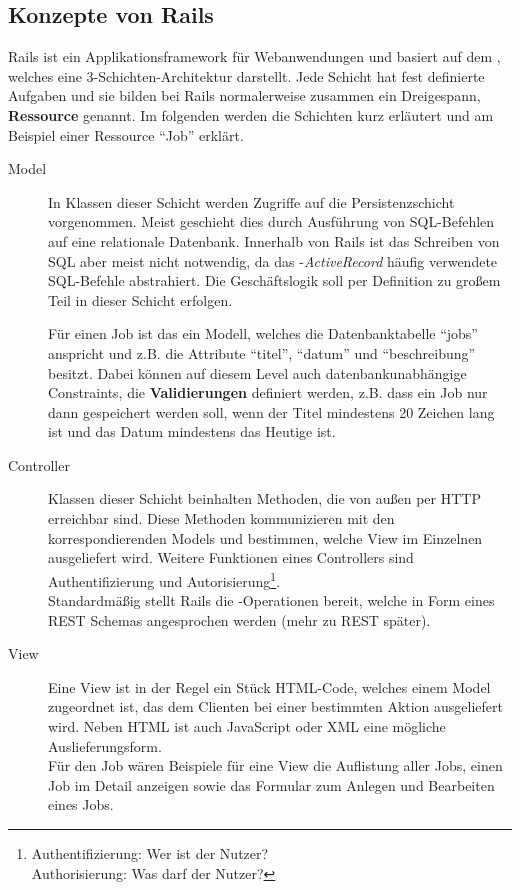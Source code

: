 \subsection{Konzepte von Rails}
\label{sec:railsconcepts}
Rails ist ein Applikationsframework für Webanwendungen und basiert auf dem  , welches eine 3-Schichten-Architektur darstellt. Jede Schicht hat fest definierte Aufgaben und sie bilden bei Rails normalerweise zusammen ein Dreigespann, \textbf{Ressource} genannt. Im folgenden werden die Schichten kurz erläutert und am Beispiel einer Ressource "`Job"' erklärt.
\begin{description}
 \item[Model] In Klassen dieser Schicht werden Zugriffe auf die Persistenzschicht vorgenommen. Meist geschieht dies durch Ausführung von SQL-Befehlen auf eine relationale Datenbank. Innerhalb von Rails ist das Schreiben von SQL aber meist nicht notwendig, da das -\textit{ActiveRecord} häufig verwendete SQL-Befehle abstrahiert. Die Geschäftslogik soll per Definition zu großem Teil in dieser Schicht erfolgen.

 Für einen Job ist das ein Modell, welches die Datenbanktabelle "`jobs"' anspricht und z.B. die Attribute "`titel"', "`datum"' und "`beschreibung"' besitzt. Dabei können auf diesem Level auch datenbankunabhängige Constraints, die \textbf{Validierungen} definiert werden, z.B. dass ein Job nur dann gespeichert werden soll, wenn der Titel mindestens 20 Zeichen lang ist und das Datum mindestens das Heutige ist.
 \item[Controller] Klassen dieser Schicht beinhalten Methoden, die von außen per HTTP erreichbar sind. Diese Methoden kommunizieren mit den korrespondierenden Models und bestimmen, welche View im Einzelnen ausgeliefert wird. Weitere Funktionen eines Controllers sind Authentifizierung und Autorisierung\footnote{Authentifizierung: Wer ist der Nutzer?\\Authorisierung: Was darf der Nutzer?}.\\
 Standardmäßig stellt Rails die -Operationen bereit, welche in Form eines REST Schemas angesprochen werden (mehr zu REST später).
 \item[View] Eine View ist in der Regel ein Stück HTML-Code, welches einem Model zugeordnet ist, das dem Clienten bei einer bestimmten Aktion ausgeliefert wird. Neben HTML ist auch JavaScript oder XML eine mögliche Auslieferungsform.\\
 Für den Job wären Beispiele für eine View die Auflistung aller Jobs, einen Job im Detail anzeigen sowie das Formular zum Anlegen und Bearbeiten eines Jobs.
\end{description}
